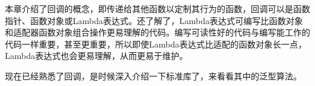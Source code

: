 本章介绍了回调的概念，即传递给其他函数以定制其行为的函数，回调可以是函数指针、函数对象或Lambda表达式。还了解了，Lambda表达式可编写比函数对象和适配器函数对象组合操作更易理解的代码。编写可读性好的代码与编写能工作的代码一样重要，甚至更重要，所以即使Lambda表达式比适配的函数对象长一点，Lambda表达式也会更易理解，从而更易于维护。

现在已经熟悉了回调，是时候深入介绍一下标准库了，来看看其中的泛型算法。
